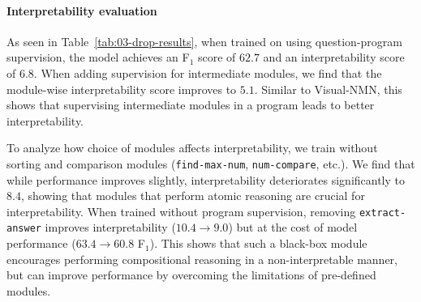 \documentclass[main.tex]{subfiles}
\begin{document}
\paragraph{Interpretability evaluation}
As seen in Table~\ref{tab:03-drop-results}, when trained on \drop{} using question-program supervision, the model achieves an F$_1$ score of $62.7$ and an interpretability score of $6.8$.
When adding supervision for intermediate modules, we find that the module-wise interpretability score improves to $5.1$.
Similar to Visual-NMN, this shows that supervising intermediate modules in a program leads to better interpretability.

To analyze how choice of modules affects interpretability, we train without sorting and comparison modules  (\texttt{find-max-num}, \texttt{num-compare}, etc.). We find that while performance improves slightly, interpretability deteriorates significantly to $8.4$,
showing that modules that perform atomic reasoning are crucial for interpretability.
When trained without program supervision, removing \texttt{extract-answer} improves interpretability  ($10.4\rightarrow 9.0$) but at the cost of model performance ($63.4 \rightarrow 60.8$ F$_1$).
This shows that such a black-box module encourages performing compositional reasoning in a non-interpretable manner, but can improve performance by overcoming the limitations of pre-defined modules.
\end{document}
